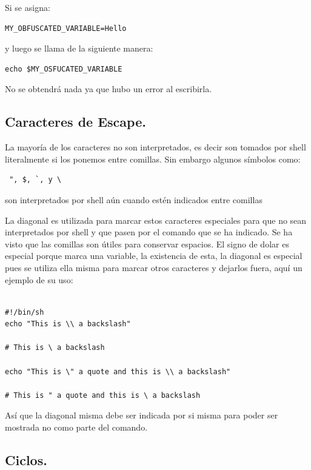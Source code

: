 \documentclass{article} %
\begin{document}
Si se asigna: 
\begin{verbatim} 
MY_OBFUSCATED_VARIABLE=Hello
\end{verbatim}

y luego se llama de la siguiente manera:

\begin{verbatim} 
echo $MY_OSFUCATED_VARIABLE
\end{verbatim}

No se obtendrá nada ya que hubo un error al escribirla.

\subsection{Caracteres de Escape.}

La mayoría de los caracteres no son interpretados, es decir son tomados por shell literalmente si los ponemos entre comillas. Sin embargo algunos símbolos como: \begin{verbatim} ", $, `, y \ \end{verbatim} son interpretados por shell aún cuando estén indicados entre comillas 

\vspace{0.5 cm}

La diagonal es utilizada para marcar estos caracteres especiales para que no sean interpretados por shell y que pasen por el comando que se ha indicado. Se ha visto que las comillas son útiles para conservar espacios. El signo de dolar es especial porque marca una variable, la existencia de esta, la diagonal es especial pues se utiliza ella misma para marcar otros caracteres y dejarlos fuera, aquí un ejemplo de su uso:

\begin{verbatim} 

#!/bin/sh
echo "This is \\ a backslash"

# This is \ a backslash

echo "This is \" a quote and this is \\ a backslash"

# This is " a quote and this is \ a backslash

\end{verbatim}

Así que la diagonal misma debe ser indicada por si misma para poder ser mostrada no como parte del comando.

\subsection{Ciclos.}
\end{document}

